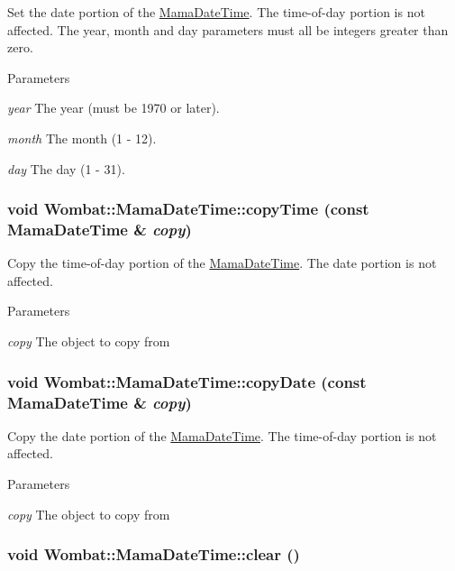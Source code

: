 Set the date portion of the \hyperlink{classWombat_1_1MamaDateTime}{MamaDateTime}. The time-\/of-\/day portion is not affected. The year, month and day parameters must all be integers greater than zero.


\begin{DoxyParams}{Parameters}
\item[{\em year}]The year (must be 1970 or later). \item[{\em month}]The month (1 -\/ 12). \item[{\em day}]The day (1 -\/ 31). \end{DoxyParams}
\hypertarget{classWombat_1_1MamaDateTime_a13ff83485883c08ce1f7a3081f3a2ad5}{
\subsubsection[{copyTime}]{\setlength{\rightskip}{0pt plus 5cm}void Wombat::MamaDateTime::copyTime (const {\bf MamaDateTime} \& {\em copy})}}
\label{classWombat_1_1MamaDateTime_a13ff83485883c08ce1f7a3081f3a2ad5}


Copy the time-\/of-\/day portion of the \hyperlink{classWombat_1_1MamaDateTime}{MamaDateTime}. The date portion is not affected.


\begin{DoxyParams}{Parameters}
\item[{\em copy}]The object to copy from \end{DoxyParams}
\hypertarget{classWombat_1_1MamaDateTime_a9db656b8007a727d23d617c00dce61b5}{
\subsubsection[{copyDate}]{\setlength{\rightskip}{0pt plus 5cm}void Wombat::MamaDateTime::copyDate (const {\bf MamaDateTime} \& {\em copy})}}
\label{classWombat_1_1MamaDateTime_a9db656b8007a727d23d617c00dce61b5}


Copy the date portion of the \hyperlink{classWombat_1_1MamaDateTime}{MamaDateTime}. The time-\/of-\/day portion is not affected.


\begin{DoxyParams}{Parameters}
\item[{\em copy}]The object to copy from \end{DoxyParams}
\hypertarget{classWombat_1_1MamaDateTime_ae54ba1acde2bfa793078c972fa6a12fd}{
\subsubsection[{clear}]{\setlength{\rightskip}{0pt plus 5cm}void Wombat::MamaDateTime::clear ()}}
\label{classWombat_1_1MamaDateTime_ae54ba1acde2bfa793078c972fa6a12fd}



